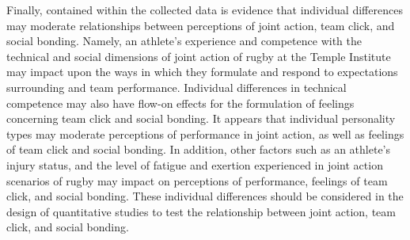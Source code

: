 \begin{CJK}{UTF8}{gbsn}
Finally, contained within the collected data is evidence that individual differences may moderate relationships between perceptions of joint action, team click, and social bonding.  Namely, an athlete's experience and competence with the technical and social dimensions of joint action of rugby at the Temple Institute may impact upon the ways in which they formulate and respond to expectations surrounding and team performance.  Individual differences in technical competence may also have flow-on effects for the formulation of feelings concerning team click and social bonding. It appears that individual personality types may moderate perceptions of performance in joint action, as well as feelings of team click and social bonding. In addition, other factors such as an athlete's injury status, and the level of fatigue and exertion experienced in joint action scenarios of rugby may impact on perceptions of performance, feelings of team click, and social bonding.  These individual differences should be considered in the design of quantitative studies to test the relationship between joint action, team click, and social bonding.















                                                          \end{CJK}
